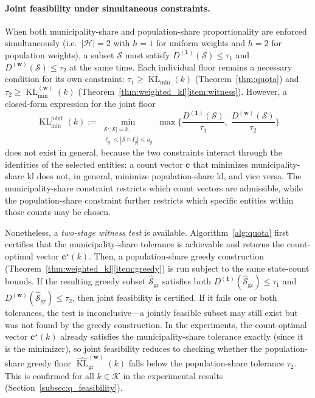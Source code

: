 \documentclass[10pt,journal]{IEEEtran}
\newcommand{\kGrid}{\mathcal{K}}
\newcommand{\1}{\mathbf{1}}
\newcommand{\bw}{\mathbf{w}}
\newcommand{\bc}{\mathbf{c}}
\newcommand{\Sel}{\mathcal{S}}
\DeclareMathOperator{\KL}{KL}
\theoremstyle{ieeethm}
\begin{document}
\paragraph{Joint feasibility under simultaneous constraints.}
When both municipality-share and population-share proportionality are enforced simultaneously (i.e.\ $|\mathcal{H}|=2$ with $h=1$ for uniform weights and $h=2$ for population weights), a subset $\Sel$ must satisfy $D^{(\mathbf{1})}(\Sel)\le\tau_1$ and $D^{(\bw)}(\Sel)\le\tau_2$ at the same time. Each individual floor remains a necessary condition for its own constraint: $\tau_1\ge\KL_{\min}(k)$ (Theorem~\ref{thm:quota}) and $\tau_2\ge\KL_{\min}^{(\bw)}(k)$ (Theorem~\ref{thm:weighted_kl}\ref{item:witness}). However, a closed-form expression for the joint floor
\[
\KL_{\min}^{\mathrm{joint}}(k)
:=
\min_{\substack{\Sel:|\Sel|=k,\\ \ell_g\le|\Sel\cap I_g|\le u_g}}
\max\!\Big\{\frac{D^{(\mathbf{1})}(\Sel)}{\tau_1},\;\frac{D^{(\bw)}(\Sel)}{\tau_2}\Big\}
\]
does not exist in general, because the two constraints interact through the identities of the selected entities: a count vector $\bc$ that minimizes municipality-share \gls{kl} does not, in general, minimize population-share \gls{kl}, and vice versa. The municipality-share constraint restricts which count vectors are admissible, while the population-share constraint further restricts which specific entities within those counts may be chosen.

Nonetheless, a \emph{two-stage witness test} is available. Algorithm~\ref{alg:quota} first certifies that the municipality-share tolerance is achievable and returns the count-optimal vector $\bc^\star(k)$. Then, a population-share greedy construction (Theorem~\ref{thm:weighted_kl}\ref{item:greedy}) is run subject to the same state-count bounds. If the resulting greedy subset $\widehat{\Sel}_{\mathrm{gr}}$ satisfies both $D^{(\mathbf{1})}(\widehat{\Sel}_{\mathrm{gr}})\le\tau_1$ and $D^{(\bw)}(\widehat{\Sel}_{\mathrm{gr}})\le\tau_2$, then joint feasibility is certified. If it fails one or both tolerances, the test is inconclusive---a jointly feasible subset may still exist but was not found by the greedy construction. In the experiments, the count-optimal vector $\bc^\star(k)$ already satisfies the municipality-share tolerance exactly (since it is the minimizer), so joint feasibility reduces to checking whether the population-share greedy floor $\widehat{\KL}^{(\bw)}_{\mathrm{gr}}(k)$ falls below the population-share tolerance $\tau_2$. This is confirmed for all $k\in\kGrid$ in the experimental results (Section~\ref{subsec:q_feasibility}).
\end{document}

